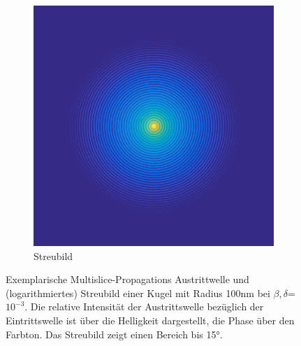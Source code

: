 \begin{figure}
\begin{subfigure}[b]{0.49\textwidth}
	 \includegraphics[width=\textwidth]{images/fig_sim_scatter_multislice-r100-bd1e-3.png}
		\caption{Streubild}
		\label{fig:scatter}
	\end{subfigure}
	\caption[Austrittswelle und Streubild einer Kugel]{Exemplarische Multislice-Propagations Austrittwelle und (logarithmiertes) Streubild einer Kugel mit Radius 100\si{nm} bei $\beta,\delta$=$10^{-3}$. Die relative Intensität der Austrittswelle bezüglich der Eintrittswelle ist über die Helligkeit dargestellt, die Phase über den Farbton. Das Streubild zeigt einen Bereich bis 15°.}
	\label{fig:exitscatter}
\end{figure}



